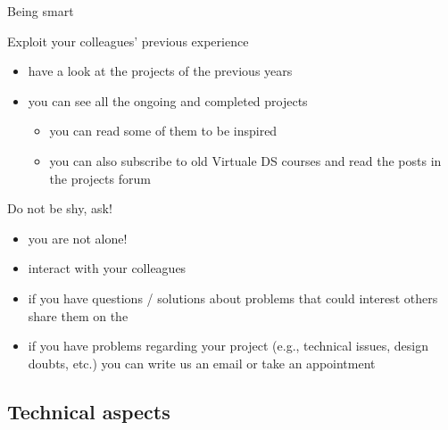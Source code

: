\documentclass[presentation]{beamer}\mode<presentation>{\usetheme{AMSBolognaFC}}
\begin{document}
\begin{frame}[c,allowframebreaks]{Being smart}
    \begin{block}{Exploit your colleagues' previous experience}
        \begin{itemize}
            \item have a look at the projects of the previous years
            \item {} you can see all the ongoing and completed projects
            \begin{itemize}
                \item you can read some of them to be inspired
                \item you can also subscribe to old Virtuale DS courses and read the posts in the projects forum
            \end{itemize}
        \end{itemize}
    \end{block}
    
    \framebreak
    
    \begin{block}{Do not be shy, ask!}
        \begin{itemize}
            \item you are not alone!
            \item interact with your colleagues
            \item if you have questions / solutions about problems that could interest others share them on the 
            \item if you have problems regarding your project (e.g., technical issues, design doubts, etc.) you can write us an email or take an appointment
        \end{itemize}
    \end{block}
\end{frame}



\subsection{Technical aspects}
\end{document}
